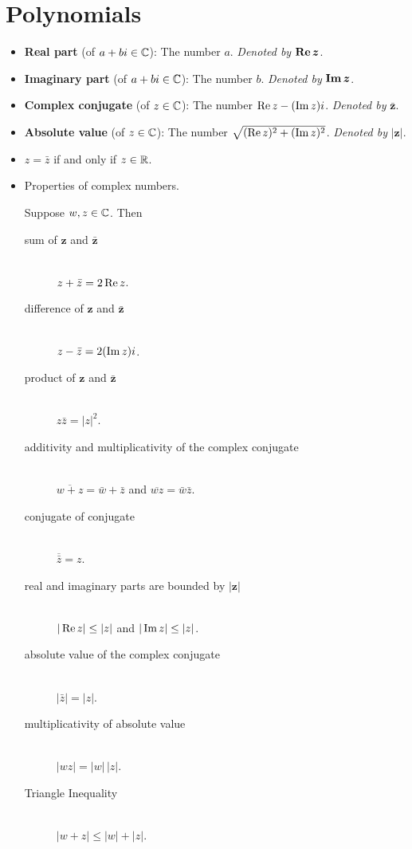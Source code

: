 \documentclass[../main.tex]{subfiles}
\begin{document}
\chapter{Polynomials}
\begin{itemize}
    \item {}\textbf{Real part} (of $a+bi\in\mathbb{C}$): The number $a$. \emph{Denoted by} $\bm{\re z}$.
    \item \textbf{Imaginary part} (of $a+bi\in\mathbb{C}$): The number $b$. \emph{Denoted by} $\bm{\im z}$.
    \item \textbf{Complex conjugate} (of $z\in\mathbb{C}$): The number $\operatorname{Re} z-(\operatorname{Im} z)i$. \emph{Denoted by} $\bm{\bar{z}}$.
    \item \textbf{Absolute value} (of $z\in\mathbb{C}$): The number $\sqrt{(\operatorname{Re} z)^2+(\operatorname{Im} z)^2}$. \emph{Denoted by} $\bm{|z|}$.
    \item $z=\bar{z}$ if and only if $z\in\mathbb{R}$.
    \item Properties of complex numbers.
    \begin{theorem}
        Suppose $w,z\in\mathbb{C}$. Then
        \begin{description}
            \item[sum of $\bm{z}$ and $\bm{\bar{z}}$]\hfill\\ $z+\bar{z}=2\operatorname{Re} z$.
            \item[difference of $\bm{z}$ and $\bm{\bar{z}}$]\hfill\\ $z-\bar{z}=2(\operatorname{Im} z)i$.
            \item[product of $\bm{z}$ and $\bm{\bar{z}}$]\hfill\\ $z\bar{z}=|z|^2$.
            \item[additivity and multiplicativity of the complex conjugate]\hfill\\ $\overline{w+z}=\bar{w}+\bar{z}$ and $\overline{wz}=\bar{w}\bar{z}$.
            \item[conjugate of conjugate]\hfill\\ $\overline{\bar{z}}=z$.
            \item[real and imaginary parts are bounded by $\bm{|z|}$]\hfill\\ $|\operatorname{Re} z|\leq|z|$ and $|\operatorname{Im} z|\leq|z|$.
            \item[absolute value of the complex conjugate]\hfill\\ $|\bar{z}|=|z|$.
            \item[multiplicativity of absolute value]\hfill\\ $|wz|=|w|\,|z|$.
            \item[Triangle Inequality]\hfill\\ $|w+z|\leq|w|+|z|$.

\end{description}
\end{theorem}
\end{itemize}
\end{document}
